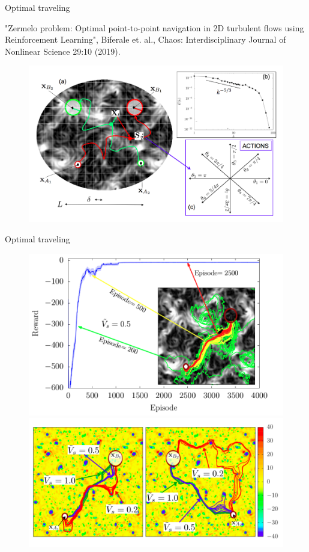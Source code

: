 \documentclass{beamer}
\begin{document}
\begin{frame}{Optimal traveling}

"Zermelo problem: Optimal point-to-point navigation in 2D turbulent flows using
Reinforcement Learning", Biferale et. al., Chaos: Interdisciplinary Journal of Nonlinear Science 29:10 (2019).

    \begin{figure}
    \begin{center}
      \includegraphics[width=.91\textwidth]{Figures/Zemelo_1}
    \end{center}
    \end{figure}
\end{frame}

\begin{frame}{Optimal traveling}
    \begin{figure}
    \begin{center}
      \includegraphics[width=.45\textwidth]{Figures/Zemelo_2} \\
      \includegraphics[width=.65\textwidth]{Figures/Zemelo_3}
    \end{center}
    \end{figure}
\end{frame}
\end{document}
